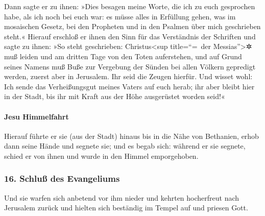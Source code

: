  Dann sagte er zu ihnen: »Dies besagen meine Worte, die
ich zu euch gesprochen habe, als ich noch bei euch war: es müsse alles
in Erfüllung gehen, was im mosaischen Gesetz, bei den Propheten und in
den Psalmen über mich geschrieben steht.«  Hierauf
erschloß er ihnen den Sinn für das Verständnis der Schriften
 und sagte zu ihnen: »So steht geschrieben:
Christus\textless sup title=``=~der Messias''\textgreater✲ muß leiden
und am dritten Tage von den Toten auferstehen,  und auf
Grund seines Namens muß Buße zur Vergebung der Sünden bei allen Völkern
gepredigt werden, zuerst aber in Jerusalem.  Ihr seid die
Zeugen hierfür.  Und wisset wohl: Ich sende das
Verheißungsgut meines Vaters auf euch herab; ihr aber bleibt hier in der
Stadt, bis ihr mit Kraft aus der Höhe ausgerüstet worden seid!«

\hypertarget{jesu-himmelfahrt}{%
\paragraph{Jesu Himmelfahrt}\label{jesu-himmelfahrt}}

 Hierauf führte er sie (aus der Stadt) hinaus bis in die
Nähe von Bethanien, erhob dann seine Hände und segnete sie;
 und es begab sich: während er sie segnete, schied er von
ihnen und wurde in den Himmel emporgehoben.

\hypertarget{schluuxdf-des-evangeliums}{%
\subsubsection{16. Schluß des
Evangeliums}\label{schluuxdf-des-evangeliums}}

 Und sie warfen sich anbetend vor ihm nieder und kehrten
hocherfreut nach Jerusalem zurück  und hielten sich
beständig im Tempel auf und priesen Gott.
